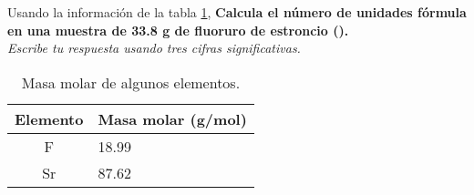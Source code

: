 Usando la información de la tabla \ref{tab:q006},
\textbf{Calcula el número de unidades fórmula en una muestra de 33.8 g de fluoruro de estroncio ().}\\
\emph{Escribe tu respuesta usando tres cifras significativas.}

\begin{multicols}{2}
    \begin{table}[H]
        \centering
        \caption{Masa molar de algunos elementos.}
        \label{tab:q006}
        \begin{tabular}{c|p{2.2cm}}
            \textbf{Elemento} & \textbf{Masa molar (g/mol)} \\\midrule
            F                 & 18.99                       \\\hline
            Sr                & 87.62                       \\\hline
            \bottomrule
        \end{tabular}
    \end{table}

    \columnbreak

    \begin{solutionbox}{7cm}
    \end{solutionbox}
\end{multicols}